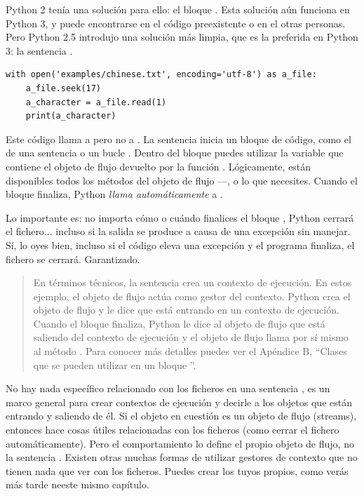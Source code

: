 Python 2 tenía una solución para ello: el bloque . Esta solución aún funciona en Python 3, y puede encontrarse en el código preexistente o en el otras personas. Pero Python 2.5 introdujo una solución más limpia, que es la preferida en Python 3: la sentencia  .

\noindent\begin{minipage}{\textwidth}
\begin{lstlisting}[mathescape=True]
with open('examples/chinese.txt', encoding='utf-8') as a_file:
    a_file.seek(17)
    a_character = a_file.read(1)
    print(a_character)
\end{lstlisting}
\end{minipage}

Este código llama a  pero no a . La sentencia  inicia un bloque de código, como el de una sentencia  o un bucle . Dentro del bloque puedes utilizar la variable  que contiene el objeto de flujo devuelto por la función . Lógicamente, están disponibles todos los métodos del objeto de flujo ---,  o lo que necesites. Cuando el bloque  finaliza, Python \emph{llama automáticamente} a .

Lo importante es: no importa cómo o cuándo finalices el bloque , Python cerrará el fichero... incluso si la salida se produce a causa de una excepción sin manejar. Sí, lo oyes bien, incluso si el código eleva una excepción y el programa finaliza, el fichero se cerrará. Garantizado.

\begin{quote}
En términos técnicos, la sentencia  crea un contexto de ejecución. En estos ejemplo, el objeto de flujo actúa como gestor del contexto. Python crea el objeto de flujo  y le dice que está entrando en un contexto de ejecución. Cuando el bloque  finaliza, Python le dice al objeto de flujo que está saliendo del contexto de ejecución y el objeto de flujo llama por sí mismo al método . Para conocer más detalles puedes ver el Apéndice B, ``Clases que se pueden utilizar en un bloque ''. 
\end{quote}

No hay nada específico relacionado con los ficheros en una sentencia , es un marco general para crear contextos de ejecución y decirle a los objetos que están entrando y saliendo de él. Si el objeto en cuestión es un objeto de flujo (streams), entonces hace cosas útiles relacionadas con los ficheros (como cerrar el fichero automáticamente). Pero el comportamiento lo define el propio objeto de flujo, no la sentencia . Existen otras muchas formas de utilizar gestores de contexto que no tienen nada que ver con los ficheros. Puedes crear los tuyos propios, como verás más tarde neeste mismo capítulo.

